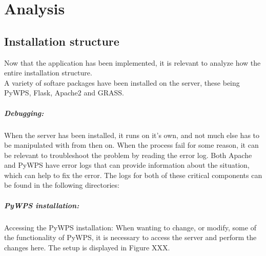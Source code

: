 
\chapter{Analysis} %

\label{ch:architecture} %


\section{Installation structure}

Now that the application has been implemented, it is relevant to analyze how the entire installation structure. \\

A variety of softare packages have been installed on the server, these being PyWPS, Flask, Apache2 and GRASS.
\paragraph{Debugging:} When the server has been installed, it runs on it's own, and not much else has to be manipulated with from then on. When the process fail for some reason, it can be relevant to troubleshoot the problem by reading the error log. Both Apache and PyWPS have error logs that can provide information about the situation, which can help to fix the error. The logs for both of these critical components can be found in the following directories:\\

\begin{figure}[h]
\end{figure}

\paragraph{PyWPS installation:}Accessing the PyWPS installation: When wanting to change, or modify, some of the functionality of PyWPS, it is necessary to access the server and perform the changes here. The setup is displayed in Figure XXX. 

\begin{figure}[h]
\end{figure}

